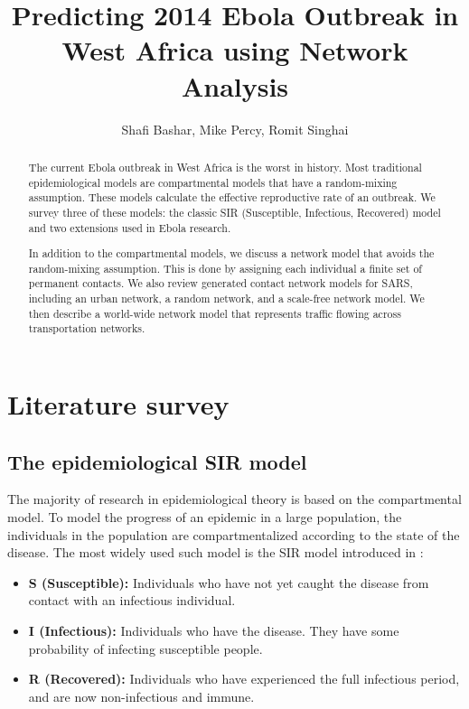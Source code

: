 \documentclass[10pt, journal,onecolumn]{IEEEtran}
\title{Predicting 2014 Ebola Outbreak in West Africa using Network Analysis}
\author{Shafi Bashar, Mike Percy, Romit  Singhai}
\affil{\textit {\{shafiab, mp81, romit\}@stanford.edu}}
\begin{document}
\maketitle

\begin{abstract}
The current Ebola outbreak in West Africa is the worst in history.
Most traditional epidemiological models are compartmental models that have a random-mixing
assumption. These models calculate the
effective reproductive rate of an outbreak. We survey three of these models: the classic
SIR (Susceptible, Infectious, Recovered) model and two extensions used in Ebola research.

In addition to the compartmental models, we discuss a network model that avoids the random-mixing
assumption. This is done by assigning each individual a finite set of permanent contacts.
We also review generated contact network models for SARS, including an urban network, a random network, and
a scale-free network model.
We then describe a world-wide network model that represents traffic flowing across transportation networks.

\end{abstract}




\section{Literature survey}
\label{sec:ReactionPaper}

\subsection{\textbf{The epidemiological SIR model \citep{very_old_paper}}}
\label{SubSec:SIR}

The majority of research in epidemiological theory is based on the compartmental model.
To model the progress of an epidemic in a large population, the
individuals in the population are compartmentalized according to the state of the disease. The most
widely used such model is the SIR model introduced in \citep{very_old_paper}:

\begin{itemize}
\item \textbf{S (Susceptible):} Individuals who have not yet caught the disease from contact with an infectious
  individual.
\item \textbf{I (Infectious):} Individuals who have the disease. They have some probability of
  infecting susceptible people.
\item \textbf{R (Recovered):} Individuals who have experienced the full infectious period, and are
  now non-infectious and immune.
\end{itemize}
\end{document}

